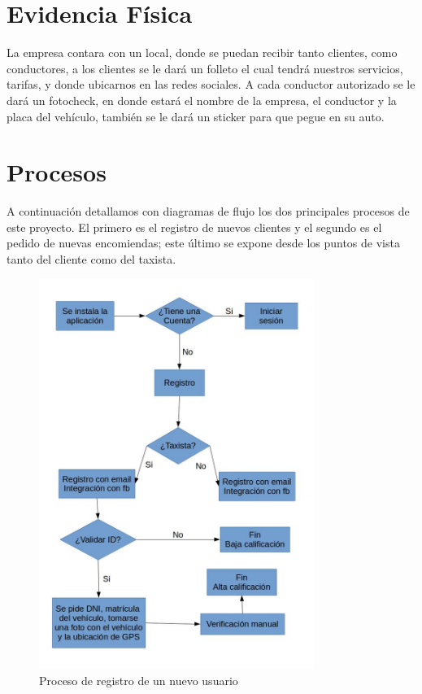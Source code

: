 \section{Evidencia Física}
La empresa contara con un local, donde se puedan recibir tanto clientes, como conductores, a los clientes se le dará un folleto el cual tendrá nuestros servicios, tarifas, y donde ubicarnos en las redes sociales.
A cada conductor autorizado se le dará un fotocheck, en donde estará el nombre de la empresa, el conductor y la placa del vehículo, también se le dará un sticker para que pegue en su auto.


\section{Procesos}

A continuación detallamos con diagramas de flujo los dos principales procesos de este proyecto. El primero es el registro de nuevos clientes y el segundo es el pedido de nuevas encomiendas; este último se expone desde los puntos de vista tanto del cliente como del taxista.

\begin{figure}[htb]
\centering
\includegraphics[width=0.8\textwidth]{./img/proceso_registro_nuevo_usuario.jpg}
\caption{Proceso de registro de un nuevo usuario} \label{fig:proc_nuevo_usuario}
\end{figure}

